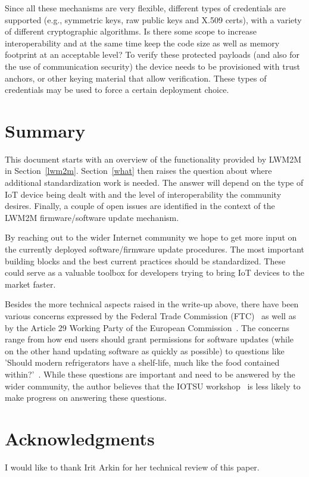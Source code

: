 \documentclass[peerreview, a4paper, 7pt]{IEEEtran}
\begin{document}
Since all these mechanisms are very flexible, different types of credentials are supported (e.g., symmetric keys, raw public keys and X.509 certs), with a variety of different cryptographic algorithms. Is there some scope to increase interoperability and at the same time keep the code size as well as memory footprint at an acceptable level? To verify these protected payloads (and also for the use of communication security) the device needs to be provisioned with trust anchors, or other keying material that allow verification. These types of credentials may be used to force a certain deployment choice.

\section{Summary}
This document starts with an overview of the functionality provided by LWM2M in Section~\ref{lwm2m}. Section~\ref{what} then raises the question about where additional standardization work is needed. The answer will depend on the type of IoT device being dealt with and the level of interoperability the community desires. Finally, a couple of open issues are identified in the context of the LWM2M firmware/software update mechanism. 

By reaching out to the wider Internet community we hope to get more input on the currently deployed software/firmware update procedures. The most important building blocks and the best current practices should be standardized. These could serve as a valuable toolbox for developers trying to bring IoT devices to the market faster.

Besides the more technical aspects raised in the write-up above, there have been various concerns expressed by the Federal Trade Commission (FTC)~\cite{FTC} as well as by the Article 29 Working Party of the European Commission~\cite{Article29WP}. The concerns range from how end users should grant permissions for software updates (while on the other hand updating software as quickly as possible) to questions like 'Should modern refrigerators have a shelf-life, much like the food contained within?'~\cite{ShelfLife}. While these questions are important and need to be answered by the wider community, the author believes that the IOTSU workshop~\cite{IOTSU} is less likely to make progress on answering these questions.  

\section{Acknowledgments}
I would like to thank Irit Arkin for her technical review of this paper. 
 

% 

\end{document}

